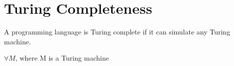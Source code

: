\documentclass{article}
\begin{document}
\section{Turing Completeness}

A programming language is Turing complete if it can simulate any Turing machine.

$\forall M$, where M is a Turing machine
\end{document}
